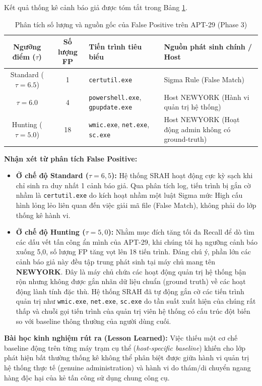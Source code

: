 \documentclass[../main.tex]{subfiles}
\begin{document}
Kết quả thống kê cảnh báo giả được tóm tắt trong Bảng \ref{table:false_positives_apt29}.

\begin{table}[H]
\centering
\begin{tabular}{|c|c|l|l|}
\hline
\textbf{Ngưỡng điểm ($\tau$)} & \textbf{Số lượng FP} & \textbf{Tiến trình tiêu biểu} & \textbf{Nguồn phát sinh chính / Host} \\ \hline
Standard ($\tau = 6.5$) & 1 & \texttt{certutil.exe} & Sigma Rule (False Match) \\ \hline
$\tau = 6.0$ & 4 & \texttt{powershell.exe}, \texttt{gpupdate.exe} & Host NEWYORK (Hành vi quản trị hệ thống) \\ \hline
Hunting ($\tau = 5.0$) & 18 & \texttt{wmic.exe}, \texttt{net.exe}, \texttt{sc.exe} & Host NEWYORK (Hoạt động admin không có ground-truth) \\ \hline
\end{tabular}
\caption{Phân tích số lượng và nguồn gốc của False Positive trên APT-29 (Phase 3)}
\label{table:false_positives_apt29}
\end{table}

\textbf{Nhận xét từ phân tích False Positive:}
\begin{itemize}
    \item \textbf{Ở chế độ Standard ($\tau = 6,5$):} Hệ thống SRAH hoạt động cực kỳ sạch khi chỉ sinh ra duy nhất 1 cảnh báo giả. Qua phân tích log, tiến trình bị gắn cờ nhầm là \texttt{certutil.exe} do kích hoạt nhầm một luật Sigma mức High cấu hình lỏng lẻo liên quan đến việc giải mã file (False Match), không phải do lớp thống kê hành vi.
    \item \textbf{Ở chế độ Hunting ($\tau = 5,0$):} Nhằm mục đích tăng tối đa Recall để dò tìm các dấu vết tấn công ẩn mình của APT-29, khi chúng tôi hạ ngưỡng cảnh báo xuống 5,0, số lượng FP tăng vọt lên 18 tiến trình. Đáng chú ý, phần lớn các cảnh báo giả này đều tập trung phát sinh tại máy chủ mang tên \textbf{NEWYORK}. Đây là máy chủ chứa các hoạt động quản trị hệ thống bận rộn nhưng không được gắn nhãn dữ liệu chuẩn (ground truth) về các hoạt động lành tính đặc thù. Hệ thống SRAH đã tự động gắn cờ các tiến trình quản trị như \texttt{wmic.exe}, \texttt{net.exe}, \texttt{sc.exe} do tần suất xuất hiện của chúng rất thấp và chuỗi gọi tiến trình của quản trị viên hệ thống có cấu trúc đột biến so với baseline thông thường của người dùng cuối.
\end{itemize}

\textbf{Bài học kinh nghiệm rút ra (Lesson Learned):}
Việc thiếu một cơ chế baseline động trên từng máy trạm cụ thể (\textit{host-specific baseline}) khiến cho lớp phát hiện bất thường thống kê không thể phân biệt được giữa hành vi quản trị hệ thống thực tế (genuine administration) và hành vi do thám/di chuyển ngang hàng độc hại của kẻ tấn công sử dụng chung công cụ.
\end{document}
